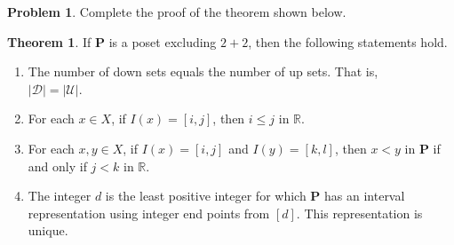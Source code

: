 \documentclass[12pt]{article}
\newcounter{chapternumber}
\theoremstyle{definition}
\newtheorem{problem-internal}{Problem}[chapternumber]
\newenvironment{problem}{
  \medskip
  \begin{problem-internal}
}{
\end{problem-internal}
}
\newtheorem*{theorem}{Theorem}
\begin{document}
  \begin{problem}
    Complete the proof of the theorem shown below.
  \end{problem}

  \begin{theorem}
    If \textbf{P} is a poset excluding \(2 + 2\), then the following statements hold.
    \begin{enumerate}
      \item The number of down sets equals the number of up sets. That is, \\
      \(|\mathcal{D}| = |\mathcal{U}|\).
      \item For each \(x \in X\), if \(I \left( x \right) = [i, j]\), then \(i \leq j\) in \(\mathbb{R}\).
      \item For each \(x, y \in X\), if \(I \left(x \right) = [i, j]\) and \(I \left( y \right) = [k, l]\), then \(x < y\) in \textbf{P} if and only if \(j < k\) in \(\mathbb{R}\).
      \item The integer \(d\) is the least positive integer for which \textbf{P} has an interval representation using integer end points from \([d]\). This representation is unique.
    \end{enumerate}
  \end{theorem}
\end{document}
